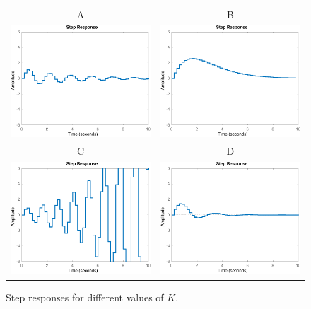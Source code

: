 \documentclass[a4paper,12pt]{article}
\begin{document}
\begin{figure}[tp]
\begin{center}
\begin{tabular}{cc}
A & B\\
\includegraphics[width=0.4\linewidth]{step-plot-3-crop}
&\includegraphics[width=0.4\linewidth]{step-plot-1-crop}\\
C & D\\
\includegraphics[width=0.4\linewidth]{step-plot-5-crop}
&\includegraphics[width=0.4\linewidth]{step-plot-2-crop}

\end{tabular}
\caption{Step responses for different values of $K$.}
\label{fig:step}
\end{center}
\end{figure}
\end{document}
